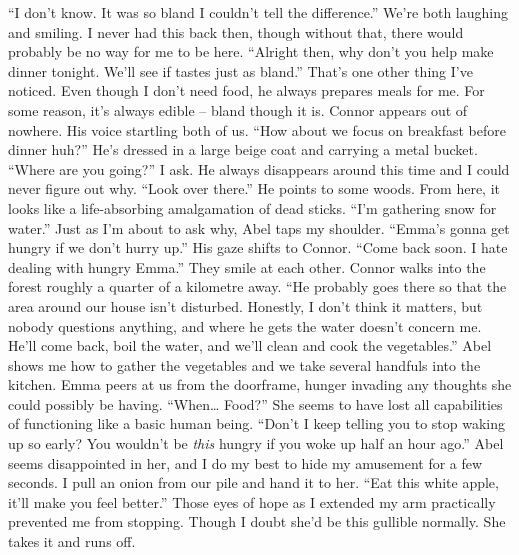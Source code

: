 \documentclass[openany, 12pt]{book}
\newcommand\tab[1][1cm]{\hspace*{#1}}
\begin{document}
\tab
``I don’t know. It was so bland I couldn’t tell the difference.''
\newline
\tab
We’re both laughing and smiling. I never had this back then, though without that, there would probably be no way for me to be here. ``Alright then, why don’t you help make dinner tonight. We’ll see if tastes just as bland.'' That's one other thing I've noticed. Even though I don't need food, he always prepares meals for me. For some reason, it's always edible -- bland though it is.
\newline
\tab
Connor appears out of nowhere. His voice startling both of us. ``How about we focus on breakfast before dinner huh?'' He’s dressed in a large beige coat and carrying a metal bucket.
\newline
\tab
``Where are you going?'' I ask. He always disappears around this time and I could never figure out why.
\newline
\tab
``Look over there.'' He points to some woods. From here, it looks like a life-absorbing amalgamation of dead sticks. ``I’m gathering snow for water.'' Just as I’m about to ask why, Abel taps my shoulder.
\newline
\tab
``Emma’s gonna get hungry if we don’t hurry up.'' His gaze shifts to Connor. ``Come back soon. I hate dealing with hungry Emma.'' They smile at each other. Connor walks into the forest roughly a quarter of a kilometre away. ``He probably goes there so that the area around our house isn’t disturbed. Honestly, I don’t think it matters, but nobody questions anything, and where he gets the water doesn't concern me. He’ll come back, boil the water, and we’ll clean and cook the vegetables.''
\newline
\tab
Abel shows me how to gather the vegetables and we take several handfuls into the kitchen. Emma peers at us from the doorframe, hunger invading any thoughts she could possibly be having. ``When… Food?'' She seems to have lost all capabilities of functioning like a basic human being.
\newline
\tab
``Don’t I keep telling you to stop waking up so early? You wouldn’t be \textit{this} hungry if you woke up half an hour ago.'' Abel seems disappointed in her, and I do my best to hide my amusement for a few seconds.
\newline
\tab
I pull an onion from our pile and hand it to her. ``Eat this white apple, it’ll make you feel better.'' Those eyes of hope as I extended my arm practically prevented me from stopping. Though I doubt she'd be this gullible normally. She takes it and runs off.
\end{document}
